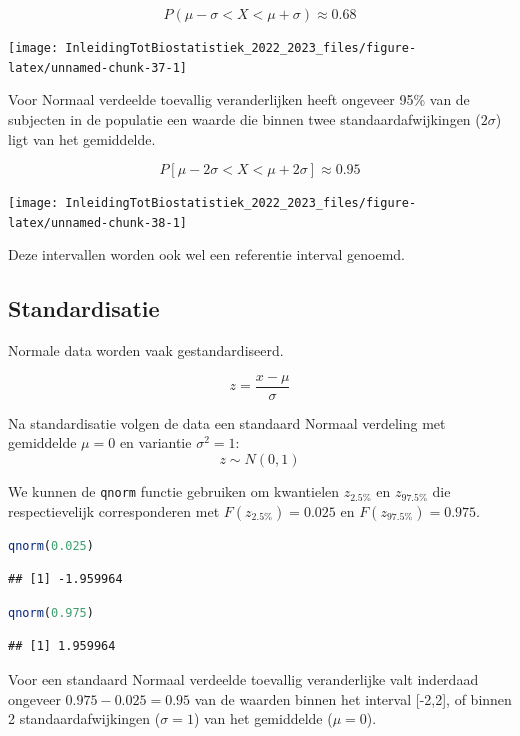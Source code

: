 \documentclass[
  12pt,dutch,coursenotes]{book}
\newcommand{\passthrough}[1]{#1}
\begin{document}
\[P(\mu-\sigma < X < \mu + \sigma) \approx 0.68\]

\begin{center}\texttt{[image: InleidingTotBiostatistiek\_2022\_2023\_files/figure-latex/unnamed-chunk-37-1]} \end{center}

Voor Normaal verdeelde toevallig veranderlijken heeft ongeveer 95\% van de subjecten in de populatie een waarde die binnen twee standaardafwijkingen (\(2 \sigma\)) ligt van het gemiddelde.

\[P[\mu - 2 \sigma < X < \mu + 2 \sigma]\approx 0.95\]

\begin{center}\texttt{[image: InleidingTotBiostatistiek\_2022\_2023\_files/figure-latex/unnamed-chunk-38-1]} \end{center}

Deze intervallen worden ook wel een referentie interval genoemd.

\hypertarget{standardisatie}{%
\subsection{Standardisatie}\label{standardisatie}}

Normale data worden vaak gestandardiseerd.

\[z=\frac{x-\mu}{\sigma}\]

Na standardisatie volgen de data een standaard Normaal verdeling met gemiddelde \(\mu=0\) en variantie \(\sigma^2=1\):
\[z \sim N(0,1)\]

We kunnen de \passthrough{\lstinline!qnorm!} functie gebruiken om kwantielen \(z_{2.5\%}\) en \(z_{97.5\%}\) die respectievelijk corresponderen met \(F(z_{2.5\%})=0.025\) en \(F(z_{97.5\%})=0.975\).

\begin{lstlisting}[language=R]
qnorm(0.025)
\end{lstlisting}

\begin{lstlisting}
## [1] -1.959964
\end{lstlisting}

\begin{lstlisting}[language=R]
qnorm(0.975)
\end{lstlisting}

\begin{lstlisting}
## [1] 1.959964
\end{lstlisting}

Voor een standaard Normaal verdeelde toevallig veranderlijke valt inderdaad ongeveer \(0.975 - 0.025=0.95\) van de waarden binnen het interval {[}-2,2{]}, of binnen 2 standaardafwijkingen (\(\sigma=1\)) van het gemiddelde (\(\mu=0\)).
\end{document}
